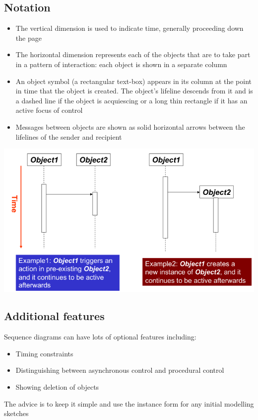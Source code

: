 \documentclass{article}[18pt]
\begin{document}
\subsection{Notation}
\begin{itemize}
	\item The vertical dimension is used to indicate time, generally proceeding down the page
	\item The horizontal dimension represents each of the objects that are to take part in a pattern of interaction: each object is shown in a separate column
	\item An object symbol (a rectangular text-box) appears in its column at the point in time that the object is created. The object's lifeline descends from it and is a dashed line if the object is acquiescing or a long thin rectangle if it has an active focus of control
	\item Messages between objects are shown as solid horizontal arrows between the lifelines of the sender and recipient
\end{itemize}
\begin{center}
	\includegraphics[scale=0.7]{"sequence diagram"}
\end{center}
\subsection{Additional features}
Sequence diagrams can have lots of optional features including:
\begin{itemize}
	\item Timing constraints
	\item Distinguishing between asynchronous control and procedural control
	\item Showing deletion of objects
\end{itemize}
The advice is to keep it simple and use the instance form for any initial modelling sketches
\end{document}

